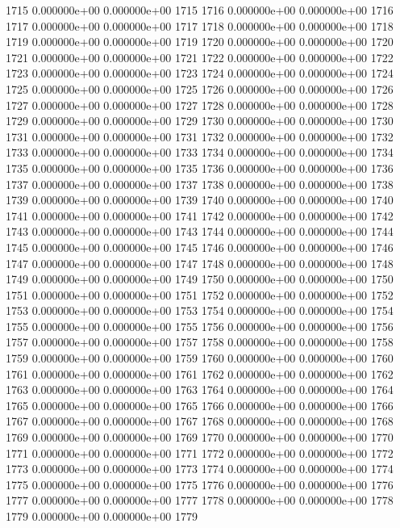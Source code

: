 \documentclass{article}
\begin{document}
\begin{Schunk}
\begin{Soutput}
1715   0.000000e+00   0.000000e+00 1715
1716   0.000000e+00   0.000000e+00 1716
1717   0.000000e+00   0.000000e+00 1717
1718   0.000000e+00   0.000000e+00 1718
1719   0.000000e+00   0.000000e+00 1719
1720   0.000000e+00   0.000000e+00 1720
1721   0.000000e+00   0.000000e+00 1721
1722   0.000000e+00   0.000000e+00 1722
1723   0.000000e+00   0.000000e+00 1723
1724   0.000000e+00   0.000000e+00 1724
1725   0.000000e+00   0.000000e+00 1725
1726   0.000000e+00   0.000000e+00 1726
1727   0.000000e+00   0.000000e+00 1727
1728   0.000000e+00   0.000000e+00 1728
1729   0.000000e+00   0.000000e+00 1729
1730   0.000000e+00   0.000000e+00 1730
1731   0.000000e+00   0.000000e+00 1731
1732   0.000000e+00   0.000000e+00 1732
1733   0.000000e+00   0.000000e+00 1733
1734   0.000000e+00   0.000000e+00 1734
1735   0.000000e+00   0.000000e+00 1735
1736   0.000000e+00   0.000000e+00 1736
1737   0.000000e+00   0.000000e+00 1737
1738   0.000000e+00   0.000000e+00 1738
1739   0.000000e+00   0.000000e+00 1739
1740   0.000000e+00   0.000000e+00 1740
1741   0.000000e+00   0.000000e+00 1741
1742   0.000000e+00   0.000000e+00 1742
1743   0.000000e+00   0.000000e+00 1743
1744   0.000000e+00   0.000000e+00 1744
1745   0.000000e+00   0.000000e+00 1745
1746   0.000000e+00   0.000000e+00 1746
1747   0.000000e+00   0.000000e+00 1747
1748   0.000000e+00   0.000000e+00 1748
1749   0.000000e+00   0.000000e+00 1749
1750   0.000000e+00   0.000000e+00 1750
1751   0.000000e+00   0.000000e+00 1751
1752   0.000000e+00   0.000000e+00 1752
1753   0.000000e+00   0.000000e+00 1753
1754   0.000000e+00   0.000000e+00 1754
1755   0.000000e+00   0.000000e+00 1755
1756   0.000000e+00   0.000000e+00 1756
1757   0.000000e+00   0.000000e+00 1757
1758   0.000000e+00   0.000000e+00 1758
1759   0.000000e+00   0.000000e+00 1759
1760   0.000000e+00   0.000000e+00 1760
1761   0.000000e+00   0.000000e+00 1761
1762   0.000000e+00   0.000000e+00 1762
1763   0.000000e+00   0.000000e+00 1763
1764   0.000000e+00   0.000000e+00 1764
1765   0.000000e+00   0.000000e+00 1765
1766   0.000000e+00   0.000000e+00 1766
1767   0.000000e+00   0.000000e+00 1767
1768   0.000000e+00   0.000000e+00 1768
1769   0.000000e+00   0.000000e+00 1769
1770   0.000000e+00   0.000000e+00 1770
1771   0.000000e+00   0.000000e+00 1771
1772   0.000000e+00   0.000000e+00 1772
1773   0.000000e+00   0.000000e+00 1773
1774   0.000000e+00   0.000000e+00 1774
1775   0.000000e+00   0.000000e+00 1775
1776   0.000000e+00   0.000000e+00 1776
1777   0.000000e+00   0.000000e+00 1777
1778   0.000000e+00   0.000000e+00 1778
1779   0.000000e+00   0.000000e+00 1779

\end{Soutput}
\end{Schunk}
\end{document}
